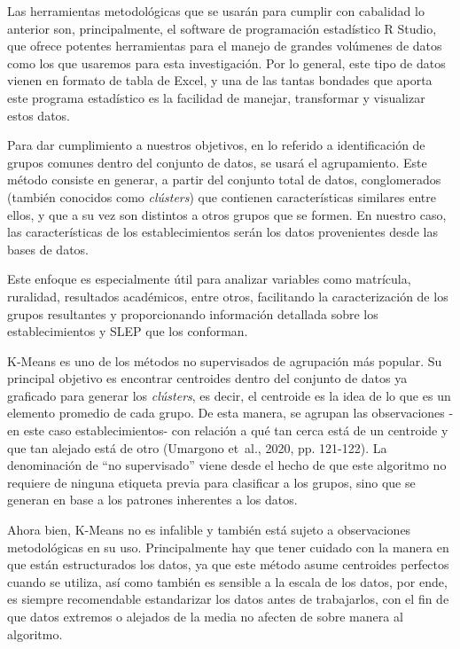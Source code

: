 \documentclass[
  12pt,
  letterpaper,
]{article}
\begin{document}
Las herramientas metodológicas que se usarán para cumplir con cabalidad lo anterior son, principalmente, el software de programación estadístico R Studio, que ofrece potentes herramientas para el manejo de grandes volúmenes de datos como los que usaremos para esta investigación.
Por lo general, este tipo de datos vienen en formato de tabla de Excel, y una de las tantas bondades que aporta este programa estadístico es la facilidad de manejar, transformar y visualizar estos datos.

Para dar cumplimiento a nuestros objetivos, en lo referido a identificación de grupos comunes dentro del conjunto de datos, se usará el agrupamiento.
Este método consiste en generar, a partir del conjunto total de datos, conglomerados (también conocidos como \emph{clústers}) que contienen características similares entre ellos, y que a su vez son distintos a otros grupos que se formen.
En nuestro caso, las características de los establecimientos serán los datos provenientes desde las bases de datos.

Este enfoque es especialmente útil para analizar variables como matrícula, ruralidad, resultados académicos, entre otros, facilitando la caracterización de los grupos resultantes y proporcionando información detallada sobre los establecimientos y SLEP que los conforman.

K-Means es uno de los métodos no supervisados de agrupación más popular.
Su principal objetivo es encontrar centroides dentro del conjunto de datos ya graficado para generar los \emph{clústers}, es decir, el centroide es la idea de lo que es un elemento promedio de cada grupo.
De esta manera, se agrupan las observaciones -en este caso establecimientos- con relación a qué tan cerca está de un centroide y que tan alejado está de otro (Umargono et~al., 2020, pp. 121-122).
La denominación de ``no supervisado'' viene desde el hecho de que este algoritmo no requiere de ninguna etiqueta previa para clasificar a los grupos, sino que se generan en base a los patrones inherentes a los datos.

Ahora bien, K-Means no es infalible y también está sujeto a observaciones metodológicas en su uso.
Principalmente hay que tener cuidado con la manera en que están estructurados los datos, ya que este método asume centroides perfectos cuando se utiliza, así como también es sensible a la escala de los datos, por ende, es siempre recomendable estandarizar los datos antes de trabajarlos, con el fin de que datos extremos o alejados de la media no afecten de sobre manera al algoritmo.
\end{document}
